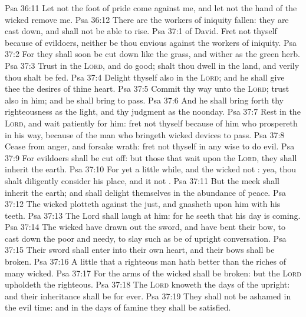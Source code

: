 \vs Psa 36:11 Let not the foot of pride come against me, and let not the hand of the wicked remove me.
\vs Psa 36:12 There are the workers of iniquity fallen: they are cast down, and shall not be able to rise.
\vs Psa 37:1  of David. Fret not thyself because of evildoers, neither be thou envious against the workers of iniquity.
\vs Psa 37:2 For they shall soon be cut down like the grass, and wither as the green herb.
\vs Psa 37:3 Trust in the \textsc{Lord}, and do good;  shalt thou dwell in the land, and verily thou shalt be fed.
\vs Psa 37:4 Delight thyself also in the \textsc{Lord}; and he shall give thee the desires of thine heart.
\vs Psa 37:5 Commit thy way unto the \textsc{Lord}; trust also in him; and he shall bring  to pass.
\vs Psa 37:6 And he shall bring forth thy righteousness as the light, and thy judgment as the noonday.
\vs Psa 37:7 Rest in the \textsc{Lord}, and wait patiently for him: fret not thyself because of him who prospereth in his way, because of the man who bringeth wicked devices to pass.
\vs Psa 37:8 Cease from anger, and forsake wrath: fret not thyself in any wise to do evil.
\vs Psa 37:9 For evildoers shall be cut off: but those that wait upon the \textsc{Lord}, they shall inherit the earth.
\vs Psa 37:10 For yet a little while, and the wicked  not : yea, thou shalt diligently consider his place, and it  not .
\vs Psa 37:11 But the meek shall inherit the earth; and shall delight themselves in the abundance of peace.
\vs Psa 37:12 The wicked plotteth against the just, and gnasheth upon him with his teeth.
\vs Psa 37:13 The Lord shall laugh at him: for he seeth that his day is coming.
\vs Psa 37:14 The wicked have drawn out the sword, and have bent their bow, to cast down the poor and needy,  to slay such as be of upright conversation.
\vs Psa 37:15 Their sword shall enter into their own heart, and their bows shall be broken.
\vs Psa 37:16 A little that a righteous man hath  better than the riches of many wicked.
\vs Psa 37:17 For the arms of the wicked shall be broken: but the \textsc{Lord} upholdeth the righteous.
\vs Psa 37:18 The \textsc{Lord} knoweth the days of the upright: and their inheritance shall be for ever.
\vs Psa 37:19 They shall not be ashamed in the evil time: and in the days of famine they shall be satisfied.
